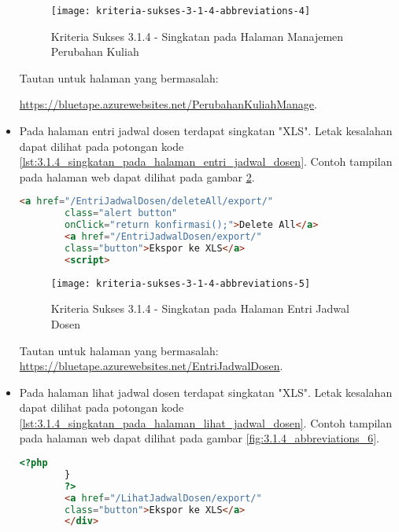 \begin{itemize}
    \begin{figure}[H]
        \centering  
        \texttt{[image: kriteria-sukses-3-1-4-abbreviations-4]}  
        \caption[Kriteria Sukses 3.1.4 - Singkatan pada Halaman Manajemen Perubahan Kuliah]{Kriteria Sukses 3.1.4 - Singkatan pada Halaman Manajemen Perubahan Kuliah}
        \label{fig:3.1.4_abbreviations_4}  
    \end{figure}
    Tautan untuk halaman yang bermasalah: 
    
    \url{https://bluetape.azurewebsites.net/PerubahanKuliahManage}.

    \item Pada halaman entri jadwal dosen terdapat singkatan "XLS". Letak kesalahan dapat dilihat pada potongan kode \ref{lst:3.1.4_singkatan_pada_halaman_entri_jadwal_dosen}. Contoh tampilan pada halaman web dapat dilihat pada gambar \ref{fig:3.1.4_abbreviations_5}.
    \begin{lstlisting}[frame=single, label={lst:3.1.4_singkatan_pada_halaman_entri_jadwal_dosen}, language=HTML, caption=Kriteria Sukses 3.1.4 - Singkatan pada Halaman Entri Jadwal Dosen]
        <a href="/EntriJadwalDosen/deleteAll/export/" 
        class="alert button" 
        onClick="return konfirmasi();">Delete All</a>
        <a href="/EntriJadwalDosen/export/" 
        class="button">Ekspor ke XLS</a>
        <script>
    \end{lstlisting}

    \begin{figure}[H]
        \centering  
        \texttt{[image: kriteria-sukses-3-1-4-abbreviations-5]}  
        \caption[Kriteria Sukses 3.1.4 - Singkatan pada Halaman Entri Jadwal Dosen]{Kriteria Sukses 3.1.4 - Singkatan pada Halaman Entri Jadwal Dosen}
        \label{fig:3.1.4_abbreviations_5}  
    \end{figure}
    Tautan untuk halaman yang bermasalah: \url{https://bluetape.azurewebsites.net/EntriJadwalDosen}.

    \item Pada halaman lihat jadwal dosen terdapat singkatan "XLS". Letak kesalahan dapat dilihat pada potongan kode \ref{lst:3.1.4_singkatan_pada_halaman_lihat_jadwal_dosen}. Contoh tampilan pada halaman web dapat dilihat pada gambar \ref{fig:3.1.4_abbreviations_6}.
    \begin{lstlisting}[frame=single, label={lst:3.1.4_singkatan_pada_halaman_lihat_jadwal_dosen}, language=HTML, caption=Kriteria Sukses 3.1.4 - Singkatan pada Halaman Lihat Jadwal Dosen]
        <?php
        }
        ?>
        <a href="/LihatJadwalDosen/export/" 
        class="button">Ekspor ke XLS</a>
        </div> 
    \end{lstlisting}


\end{itemize}

